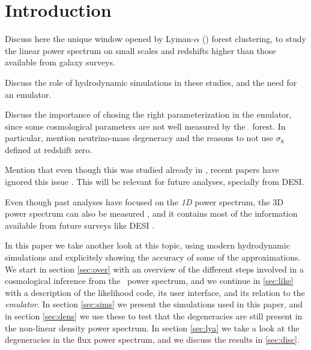 \section{Introduction} 

Discuss here the unique window opened by Lyman-$\alpha$ (\lya) forest 
clustering, to study the linear power spectrum on small scales and redshifts 
higher than those available from galaxy surveys.

Discuss the role of hydrodynamic simulations in these studies, and the need 
for an emulator.

Discuss the importance of chosing the right parameterization in the emulator, 
since some cosmological parameters are not well measured by the \lya\ forest.
In particular, mention neutrino-mass degeneracy and the reasons to not use 
$\sigma_8$ defined at redshift zero.

Mention that even though this was studied already in \cite{McDonald2005a}, 
recent papers have ignored this issue \cite{Palanque-Delabrouille2015,
Yeche2017}. 
This will be relevant for future analyses, specially from DESI.

Even though past analyses have focused on the \textit{1D} power spectrum, 
the 3D power spectrum can also be measured \cite{Font-Ribera2018}, 
and it contains most of the information available from future surveys 
like DESI \cite{Font-Ribera2014}. 

In this paper we take another look at this topic, using modern hydrodynamic 
simulations and explicitely showing the accuracy of some of the approximations.
We start in section \ref{sec:over} with an overview of the different steps 
involved in a cosmological inference from the \lya\ power spectrum, and we 
continue in \ref{sec:like} with a description of the likelihood code, 
its user interface, and its relation to the \textit{emulator}.
In section \ref{sec:sims} we present the simulations used in this paper, and 
in section \ref{sec:dens} we use these to test that the degeneracies are 
still present in the non-linear density power spectrum. 
In section \ref{sec:lya} we take a look at the degeneracies in the flux 
power spectrum, and we discuss the results in \ref{sec:disc}.

 
